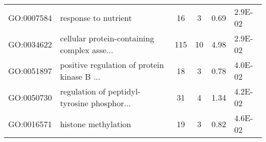 \begin{table}[ht]
\begin{tabular}{llcccl}
  GO:0007584 & response to nutrient &  16 &   3 & 0.69 & 2.9E-02 \\ 
  GO:0034622 & cellular protein-containing complex asse... & 115 &  10 & 4.98 & 2.9E-02 \\ 
  GO:0051897 & positive regulation of protein kinase B ... &  18 &   3 & 0.78 & 4.0E-02 \\ 
  GO:0050730 & regulation of peptidyl-tyrosine phosphor... &  31 &   4 & 1.34 & 4.2E-02 \\ 
  GO:0016571 & histone methylation &  19 &   3 & 0.82 & 4.6E-02 \\ 
   \hline
\end{tabular}
\label{P-value, LFC > 1.4, Positive}
\end{table}


